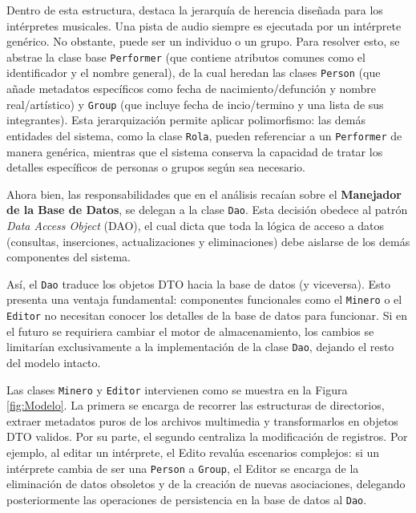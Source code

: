 \documentclass{rep}
\begin{document}
    Dentro de esta estructura, destaca la jerarquía de herencia
    diseñada para los intérpretes musicales. Una pista de audio
    siempre es ejecutada por un intérprete genérico. No obstante,
    puede ser un individuo o un grupo. Para resolver esto, se abstrae
    la clase base \texttt{Performer} (que contiene atributos comunes
    como el identificador y el nombre general), de la cual heredan las
    clases \texttt{Person} (que añade metadatos específicos como fecha
    de nacimiento/defunción y nombre real/artístico) y \texttt{Group}
    (que incluye fecha de incio/termino y una lista de sus
    integrantes). Esta jerarquización permite aplicar polimorfismo:
    las demás entidades del sistema, como la clase \texttt{Rola},
    pueden referenciar a un \texttt{Performer} de manera genérica,
    mientras que el sistema conserva la capacidad de tratar los
    detalles específicos de personas o grupos según sea necesario.

    Ahora bien, las responsabilidades que en el análisis recaían sobre
    el \textbf{Manejador de la Base de Datos}, se delegan a la clase
    \texttt{Dao}. Esta decisión obedece al patrón \textit{Data Access
      Object} (DAO), el cual dicta que toda la lógica de acceso a
    datos (consultas, inserciones, actualizaciones y eliminaciones)
    debe aislarse de los demás componentes del sistema.

    Así, el \texttt{Dao} traduce los objetos DTO hacia la base de
    datos (y viceversa). Esto presenta una ventaja fundamental:
    componentes funcionales como el \texttt{Minero} o el
    \texttt{Editor} no necesitan conocer los detalles de la base de
    datos para funcionar. Si en el futuro se requiriera cambiar el
    motor de almacenamiento, los cambios se limitarían exclusivamente
    a la implementación de la clase \texttt{Dao}, dejando el resto del
    modelo intacto.

    Las clases \texttt{Minero} y \texttt{Editor} intervienen como se
    muestra en la Figura \ref{fig:Modelo}. La primera se encarga de
    recorrer las estructuras de directorios, extraer metadatos puros
    de los archivos multimedia y transformarlos en objetos DTO
    validos. Por su parte, el segundo centraliza la modificación de
    registros. Por ejemplo, al editar un intérprete, el Edito revalúa
    escenarios complejos: si un intérprete cambia de ser una
    \texttt{Person} a \texttt{Group}, el Editor se encarga de la
    eliminación de datos obsoletos y de la creación de nuevas
    asociaciones, delegando posteriormente las operaciones de
    persistencia en la base de datos al \texttt{Dao}.
\end{document}
